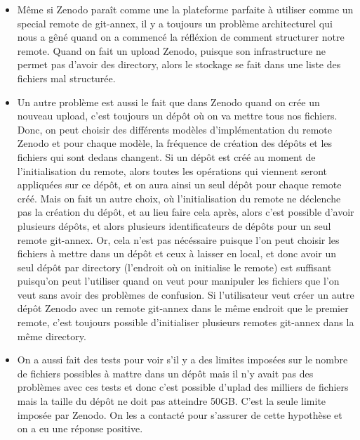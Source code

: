 \documentclass[11pt]{article}
\begin{document}
\begin{itemize}
\item Même si Zenodo paraît comme une la plateforme parfaite à utiliser comme un
special remote de git-annex, il y a toujours un problème
architecturel qui nous a gêné quand on a commencé la réfléxion de
comment structurer notre remote. Quand on fait un upload Zenodo,
puisque son infrastructure ne permet pas d'avoir des directory,
alors le stockage se fait dans une liste des fichiers mal structurée.
\item Un autre problème est aussi le fait que dans Zenodo quand on crée un
nouveau upload, c'est toujours un dépôt où on va mettre tous nos
fichiers. Donc, on peut choisir des différents modèles
d'implémentation du remote Zenodo et pour chaque modèle, la
fréquence de création des dépôts et les fichiers qui sont dedans
changent. Si un dépôt est créé au moment de l'initialisation du
remote, alors toutes les opérations qui viennent seront appliquées
sur ce dépôt, et on aura ainsi un seul dépôt pour chaque remote
créé. Mais on fait un autre choix, où l'initialisation du remote ne
déclenche pas la création du dépôt, et au lieu faire cela après,
alors c'est possible d'avoir plusieurs dépôts, et alors plusieurs
identificateurs de dépôts pour un seul remote git-annex. Or, cela
n'est pas nécéssaire puisque l'on peut choisir les fichiers à mettre
dans un dépôt et ceux à laisser en local, et donc avoir un seul
dépôt par directory (l'endroit où on initialise le remote) est
suffisant puisqu'on peut l'utiliser quand on veut pour manipuler les
fichiers que l'on veut sans avoir des problèmes de confusion. Si
l'utilisateur veut créer un autre dépôt Zenodo avec un remote
git-annex dans le même endroit que le premier remote, c'est toujours
possible d'initialiser plusieurs remotes git-annex dans la même
directory.
\item On a aussi fait des tests pour voir s'il y a des limites imposées
sur le nombre de fichiers possibles à mattre dans un dépôt mais il
n'y avait pas des problèmes avec ces tests et donc c'est possible
d'uplad des milliers de fichiers mais la taille du dépôt ne doit pas
atteindre 50GB. C'est la seule limite imposée par Zenodo. On les a
contacté pour s'assurer de cette hypothèse et on a eu une réponse positive.
\end{itemize}
\end{document}
